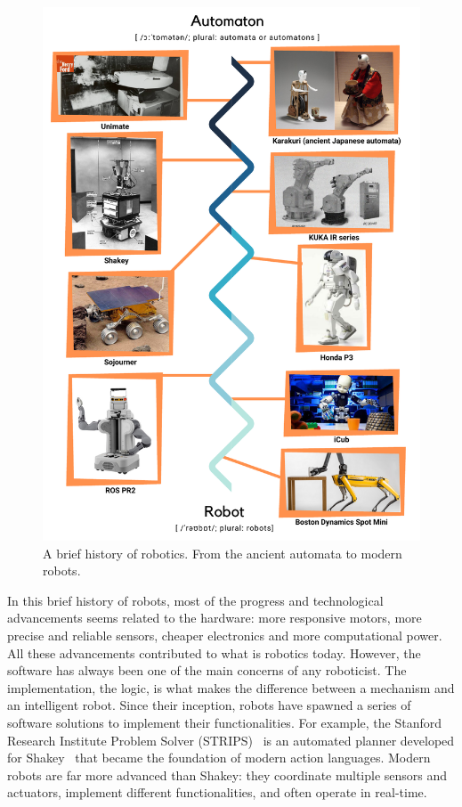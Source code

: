 \begin{figure}
    \centering
    \includegraphics[width=\textwidth]{gfx/history}
    \caption{A brief history of robotics. From the ancient automata to modern robots.}\label{fig:history}
\end{figure}

In this brief history of robots, most of the progress and technological advancements seems related to the hardware: more responsive motors, more precise and reliable sensors, cheaper electronics and more computational power. All these advancements contributed to what is robotics today. However, the software has always been one of the main concerns of any roboticist. The implementation, the logic, is what makes the difference between a mechanism and an intelligent robot. Since their inception, robots have spawned a series of software solutions to implement their functionalities. For example, the Stanford Research Institute Problem Solver (STRIPS)~\cite{lifschitz1987semantics} is an automated planner developed for Shakey~\cite{nilsson1984shakey} that became the foundation of modern action languages. Modern robots are far more advanced than Shakey: they coordinate multiple sensors and actuators,  implement different functionalities, and often operate in real-time.

